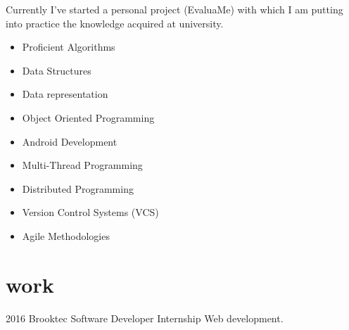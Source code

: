 \documentclass[]{friggeri-cv} %
\begin{document}
        Currently I've started a personal project (EvaluaMe) with which I am putting into practice the knowledge acquired at university.

        \noindent\begin{minipage}[t]{0.5\linewidth}
            \begin{itemize}
            	\item{Proficient Algorithms}
        	\item{Data Structures}
            	\item{Data representation}
            	\item{Object Oriented Programming}
            	\item{Android Development}

            \end{itemize}
            \end{minipage}%
            \begin{minipage}[t]{0.5\linewidth}
            \begin{itemize}
            	\item{Multi-Thread Programming}
            	\item{Distributed Programming}
           	\item{Version Control Systems (VCS)}
           	\item{Agile Methodologies}
            \end{itemize}
        \end{minipage}\par\bigskip




    \section{work}

        \begin{entrylist}

            \entry
            {2016}
            {Brooktec}
            {Software Developer Internship}
            {Web development.}

        \end{entrylist}

\end{document}
